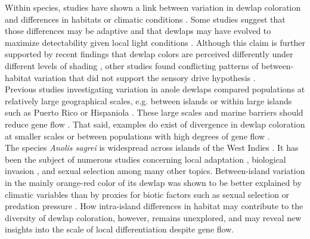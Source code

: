 Within species, studies have shown a link between variation in dewlap coloration and differences in habitats or climatic conditions \citep{Macedonia2001, Leal2002, Thorpe2002, Thorpe2002a, Leal2004, Vanhooydonck2009, Ng2012, Ng2013, Ng2016, Vanhooydonck2009, Driessens2017}. Some studies suggest that those differences may be adaptive and that dewlaps may have evolved to maximize detectability given local light conditions \citep{Fleishman2001, Leal2002, Leal2004}. Although this claim is further supported by recent findings that dewlap colors are perceived differently under different levels of shading \citep{Fleishman2020}, other studies found conflicting patterns of between-habitat variation that did not support the sensory drive hypothesis \citep{Fleishman2009, Ng2012, Macedonia2014}.\\ 

Previous studies investigating variation in anole dewlaps compared populations at relatively large geographical scales, e.g. between islands \citep{Vanhooydonck2009, Driessens2017} or within large islands such as Puerto Rico \citep{Leal2004} or Hispaniola \citep{Ng2012, Ng2016}. These large scales and marine barriers should reduce gene flow \citep{Ng2011, Lambert2013, Richardson2014, Ng2017}. That said, examples do exist of divergence in dewlap coloration at smaller scales or between populations with high degrees of gene flow \citep{Thorpe2002, Thorpe2002a, Stapley2011, Ng2016}.\\

The species \textit{Anolis sagrei} is widespread across islands of the West Indies \citep{Reynolds2020}. It has been the subject of numerous studies concerning local adaptation \citep{Losos1994, Losos1997a, Losos2001, Kolbe2012}, biological invasion \citep{Kolbe2008}, and sexual selection \citep{Tokarz2002, Tokarz2005, Tokarz2006, Driessens2014, Steffen2014, Driessens2015} among many other topics. Between-island variation in the mainly orange-red color of its dewlap was shown to be better explained by climatic variables \citep{Driessens2017} than by proxies for biotic factors such as sexual selection or predation pressure \citep{Vanhooydonck2009, Baeckens2018}. How intra-island differences in habitat may contribute to the diversity of dewlap coloration, however, remains unexplored, and may reveal new insights into the scale of local differentiation despite gene flow.\\


